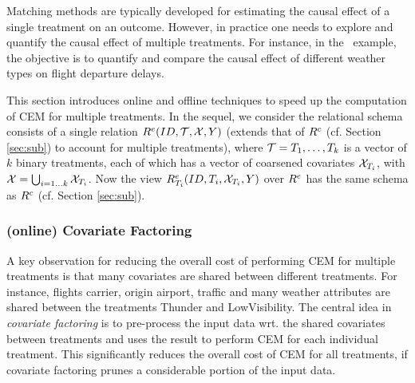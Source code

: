 \label{sec:mte}

Matching methods are typically developed for estimating the causal effect of a single treatment
on an outcome. However, in practice one needs
to explore and quantify the causal effect of multiple treatments.
For instance, in the \delay \ example, the objective is to quantify and compare the causal effect
of different weather types on flight departure delays.

This section introduces online and offline techniques to speed up the computation of  CEM
for multiple treatments.  In the sequel, we consider the relational schema consists of a single relation ${{R}^e}(ID,{{\mathcal{T}}},{{\mathcal{X}}},Y)$ (extends that of ${{R}^c}$ (cf. Section \ref{sec:sub}) to account for multiple treatments), where ${{\mathcal{T}}}=T_1, \ldots, T_k$ is a vector of $k$ binary
treatments, each of which has a vector of coarsened covariates ${{\mathcal{X}}}_{T_i}$, with ${{\mathcal{X}}}= \bigcup_{i=1 \ldots k} {{\mathcal{X}}}_{T_i}$.
Now the view ${{R}^e_{T_i}}(ID,T_i,{{\mathcal{X}}}_{T_i},Y)$ over ${{R}^e}$ has the same schema
as ${{R}^c}$ (cf. Section \ref{sec:sub}). 


\vspace{-.2cm}

\subsubsection{(online) Covariate Factoring}

A key observation for reducing the overall cost of performing CEM for multiple treatments is that
many covariates are shared between different treatments. For instance, flights carrier, origin airport, traffic and many weather attributes are shared between the treatments Thunder and LowVisibility. The central idea in {\em covariate factoring}  is to pre-process the input data
wrt.  the shared covariates between treatments and uses the result to perform CEM
for each individual treatment. This  significantly reduces the overall cost of CEM for all treatments,
if covariate factoring prunes a considerable portion of the input data.


